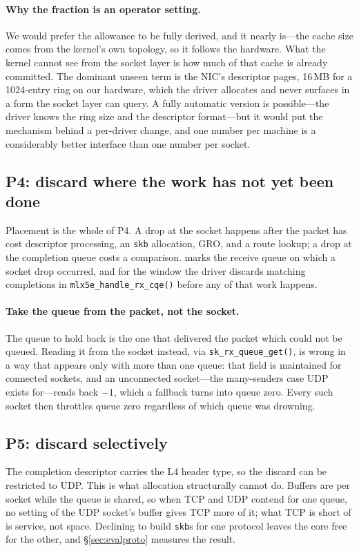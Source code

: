 \paragraph{Why the fraction is an operator setting.} We would prefer the
allowance to be fully derived, and it nearly is---the cache size comes from the
kernel's own topology, so it follows the hardware. What the kernel cannot see
from the socket layer is how much of that cache is already committed. The
dominant unseen term is the NIC's descriptor pages, 16\,MB for a 1024-entry ring
on our hardware, which the driver allocates and never surfaces in a form the
socket layer can query. A fully automatic version is possible---the driver knows
the ring size and the descriptor format---but it would put the mechanism behind
a per-driver change, and one number per machine is a considerably better
interface than one number per socket.

\subsection{P4: discard where the work has not yet been done}
\label{sec:d-place}

Placement is the whole of P4. A drop at the socket happens after the packet has
cost descriptor processing, an \texttt{skb} allocation, GRO, and a route lookup;
a drop at the completion queue costs a comparison. \sys marks the receive queue
on which a socket drop occurred, and for the window the driver discards matching
completions in \texttt{mlx5e\_handle\_rx\_cqe()} before any of that work
happens.

\paragraph{Take the queue from the packet, not the socket.} The queue to hold
back is the one that delivered the packet which could not be queued. Reading it
from the socket instead, via \texttt{sk\_rx\_queue\_get()}, is wrong in a way
that appears only with more than one queue: that field is maintained for
connected sockets, and an unconnected socket---the many-senders case UDP exists
for---reads back $-1$, which a fallback turns into queue zero. Every such socket
then throttles queue zero regardless of which queue was drowning.

\subsection{P5: discard selectively}
\label{sec:d-select}

The completion descriptor carries the L4 header type, so the discard can be
restricted to UDP. This is what allocation structurally cannot do. Buffers are
per socket while the queue is shared, so when TCP and UDP contend for one queue,
no setting of the UDP socket's buffer gives TCP more of it; what TCP is short of
is service, not space. Declining to build \texttt{skb}s for one protocol leaves
the core free for the other, and \S\ref{sec:evalproto} measures the result.
